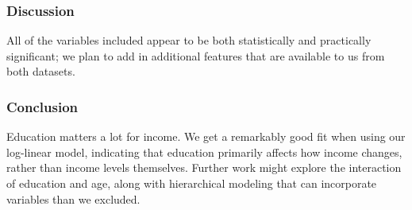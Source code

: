 \documentclass{beamer}
\begin{document}
\frame %
{
  \frametitle{Discussion}
  
  All of the variables included appear to be both statistically and practically significant; we plan to add in additional features that are available to us from both datasets.

}

\frame %
{
  \frametitle{Conclusion}
  Education matters a lot for income. We get a remarkably good fit when using our log-linear model, indicating that education primarily affects how income changes, rather than income levels themselves. Further work might explore the interaction of education and age, along with hierarchical modeling that can incorporate variables than we excluded.

}
\end{document}
